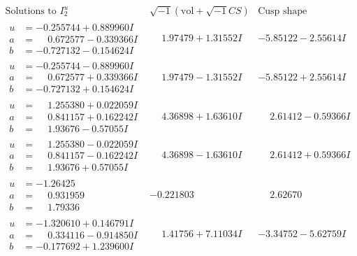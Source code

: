 \documentclass[1p]{elsarticle_modified}
\theoremstyle{definition}
\newcommand{\I}{\sqrt{-1}}
\begin{document}
$$\begin{array}{c|c|c}  
\text{Solutions to }I^u_{2}& \I (\text{vol} + \sqrt{-1}CS) & \text{Cusp shape}\\
 \hline 
\begin{aligned}
u &= -0.255744 + 0.889960 I \\
a &= \phantom{-}0.672577 - 0.339366 I \\
b &= -0.727132 - 0.154624 I\end{aligned}
 & \phantom{-}1.97479 + 1.31552 I & -5.85122 - 2.55614 I \\ \hline\begin{aligned}
u &= -0.255744 - 0.889960 I \\
a &= \phantom{-}0.672577 + 0.339366 I \\
b &= -0.727132 + 0.154624 I\end{aligned}
 & \phantom{-}1.97479 - 1.31552 I & -5.85122 + 2.55614 I \\ \hline\begin{aligned}
u &= \phantom{-}1.255380 + 0.022059 I \\
a &= \phantom{-}0.841157 + 0.162242 I \\
b &= \phantom{-}1.93676 - 0.57055 I\end{aligned}
 & \phantom{-}4.36898 + 1.63610 I & \phantom{-}2.61412 - 0.59366 I \\ \hline\begin{aligned}
u &= \phantom{-}1.255380 - 0.022059 I \\
a &= \phantom{-}0.841157 - 0.162242 I \\
b &= \phantom{-}1.93676 + 0.57055 I\end{aligned}
 & \phantom{-}4.36898 - 1.63610 I & \phantom{-}2.61412 + 0.59366 I \\ \hline\begin{aligned}
u &= -1.26425\phantom{ +0.000000I} \\
a &= \phantom{-}0.931959\phantom{ +0.000000I} \\
b &= \phantom{-}1.79336\phantom{ +0.000000I}\end{aligned}
 & -0.221803\phantom{ +0.000000I} & \phantom{-}2.62670\phantom{ +0.000000I} \\ \hline\begin{aligned}
u &= -1.320610 + 0.146791 I \\
a &= \phantom{-}0.334116 - 0.914850 I \\
b &= -0.177692 + 1.239600 I\end{aligned}
 & \phantom{-}1.41756 + 7.11034 I & -3.34752 - 5.62759 I \\ \hline\begin{aligned}

\end{aligned}
\end{array}$$
\end{document}
